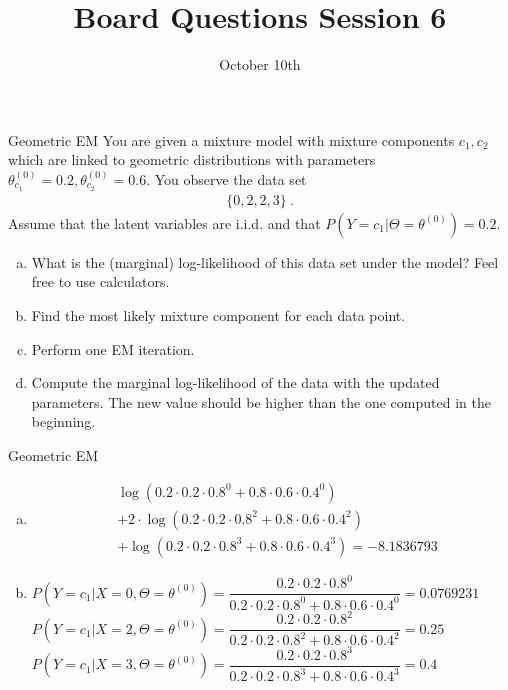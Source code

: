 \documentclass{beamer}\usepackage[]{graphicx}\usepackage[]{color}
\title{Board Questions Session 6}
\date{October 10th}
\begin{document}
\begin{frame}{Geometric EM}
\small
You are given a mixture model with mixture components $ c_{1},c_{2} $ which are linked to geometric
distributions with parameters $ \theta^{(0)}_{c_{1}} = 0.2, \theta^{(0)}_{c_{2}} = 0.6 $. You
observe the data set
\begin{align*}
\{0, 2, 2, 3\} \ .
\end{align*}
Assume that the latent variables are i.i.d. and that $ P(Y=c_{1}|\Theta=\theta^{(0)}) = 0.2 $.
\begin{enumerate}[a)]
\item What is the (marginal) log-likelihood of this data set under the model? Feel free to use
calculators.
\item Find the most likely mixture component for each data point.
\item Perform one EM iteration.
\item Compute the marginal log-likelihood of the data with the updated parameters. The new value
should be higher than the one computed in the beginning.
\end{enumerate}
\end{frame}

\begin{frame}{Geometric EM}
\small
\begin{enumerate}[a)]
\item \begin{align*}
&\log(0.2\cdot 0.2\cdot 0.8^{0} + 0.8 \cdot 0.6 \cdot 0.4^{0}) \\
&+ 2\cdot \log(0.2\cdot 0.2 \cdot 0.8^{2} + 0.8\cdot 0.6 \cdot 0.4^{2}) \\
&+ \log(0.2\cdot 0.2 \cdot 0.8^{3} + 0.8\cdot 0.6 \cdot 0.4^{3})
= \ensuremath{-8.1836793}
\end{align*}
\item $ P(Y = c_{1}|X=0, \Theta=\theta^{(0)}) = \dfrac{0.2\cdot 0.2\cdot 0.8^{0}}{0.2\cdot 0.2\cdot 0.8^{0} + 0.8 \cdot 0.6 \cdot 0.4^{0}} = 0.0769231 $
\\ \vspace{.4cm}
$ P(Y = c_{1}|X=2, \Theta=\theta^{(0)}) = \dfrac{0.2\cdot 0.2\cdot 0.8^{2}}{0.2\cdot 0.2\cdot 0.8^{2} + 0.8 \cdot 0.6 \cdot 0.4^{2}} = 0.25 $
\\ \vspace{.4cm}
$ P(Y = c_{1}|X=3, \Theta=\theta^{(0)}) = \dfrac{0.2\cdot 0.2\cdot 0.8^{3}}{0.2\cdot 0.2\cdot 0.8^{3} + 0.8 \cdot 0.6 \cdot 0.4^{3}} = 0.4 $
\end{enumerate}
\end{frame}
\end{document}
